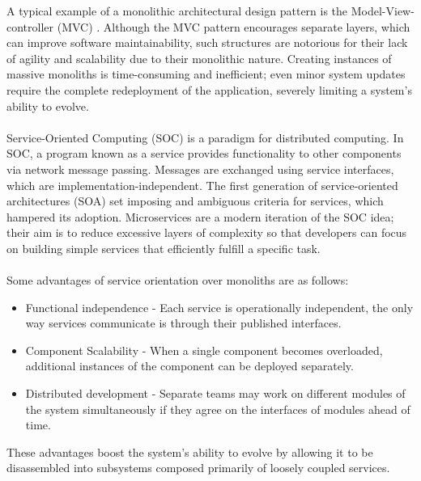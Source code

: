 A typical example of a monolithic architectural design pattern is the Model-View-controller (MVC) \cite{mvc, microservices}.
Although the MVC pattern encourages separate layers, which can improve software maintainability,
such structures are notorious for their lack of agility and scalability due to their monolithic nature.
Creating instances of massive monoliths is time-consuming and inefficient;
even minor system updates require the complete redeployment of the application, severely limiting a system's ability to evolve.

\paragraph{}

Service-Oriented Computing (SOC) \cite{6} is a paradigm for distributed computing.
In SOC, a program known as a service provides functionality to other components via network message passing.
Messages are exchanged using service interfaces, which are implementation-independent.
The first generation of service-oriented architectures (SOA) \cite{7} set imposing and ambiguous criteria for services, which hampered its adoption.
Microservices \cite{microservices} are a modern iteration of the SOC idea;
their aim is to reduce excessive layers of complexity so that developers can focus on building simple services that efficiently fulfill a specific task.

\paragraph{}

Some advantages of service orientation over monoliths are as follows:
\begin{itemize}
    \item Functional independence - Each service is operationally independent, the only way services communicate is through their published interfaces.
    \item Component Scalability - When a single component becomes overloaded, additional instances of the component can be deployed separately.
    \item Distributed development - Separate teams may work on different modules of the system simultaneously if they agree on the interfaces of modules ahead of time.
\end{itemize}

These advantages boost the system's ability to evolve by allowing it to be disassembled into subsystems composed primarily of loosely coupled services.

